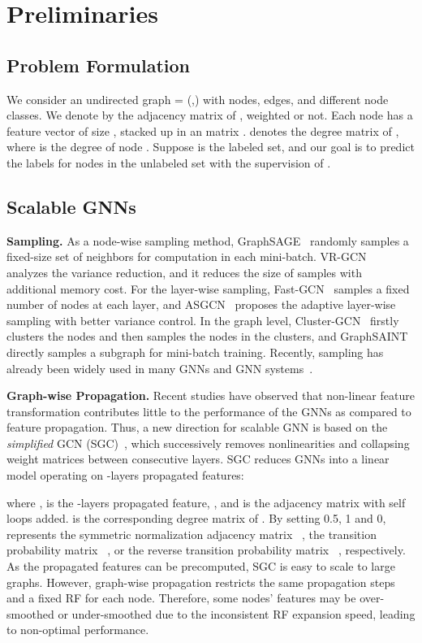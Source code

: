 \documentclass[sigconf]{acmart}
\begin{document}
\section{Preliminaries}
\subsection{Problem Formulation} 
We consider an undirected graph  = (,) with  nodes,  edges, and  different node classes. We denote by  the adjacency matrix of , weighted or not. 
Each node has a feature vector of size , stacked up in an  matrix .  denotes the degree matrix of , where  is the degree of node . 
Suppose  is the labeled set, and our goal is to predict the labels for nodes in the unlabeled set  with the supervision of .

\subsection{Scalable GNNs}
\textbf{Sampling.} 
As a node-wise sampling method, GraphSAGE~\citep{hamilton2017inductive} randomly samples a fixed-size set of neighbors for computation in each mini-batch. VR-GCN~\citep{DBLP:conf/icml/ChenZS18} analyzes the variance reduction, and it reduces the size of samples with additional memory cost.
For the layer-wise sampling, Fast-GCN~\citep{DBLP:conf/iclr/ChenMX18} samples a fixed number of nodes at each layer, and ASGCN~\citep{DBLP:conf/nips/Huang0RH18} proposes the adaptive layer-wise sampling with better variance control.
In the graph level, Cluster-GCN~\citep{chiang2019cluster} firstly clusters the nodes and then samples the nodes in the clusters, and GraphSAINT~\citep{DBLP:conf/iclr/ZengZSKP20} directly samples a subgraph for mini-batch training. 
Recently, sampling has already been widely used in many GNNs and GNN systems~\citep{distdgl_ai3_2020, aligraph_vldb_2019, pygeometric_iclr_2019}.

\noindent\textbf{Graph-wise Propagation.} 
Recent studies have observed that non-linear feature transformation contributes little to the performance of the GNNs as compared to feature propagation.
Thus, a new direction for scalable GNN is based on the \emph{simplified} GCN (SGC)~\citep{wu2019simplifying}, which successively removes nonlinearities and collapsing weight matrices between consecutive layers. 
SGC reduces GNNs into a linear model operating on -layers propagated features: 

\label{eq_GC}
\noindent\ignorespacesafterend
where ,  is the -layers propagated feature, , and  is the adjacency matrix  with self loops added.
 is the corresponding degree matrix of .
By setting  0.5, 1 and 0,  represents the symmetric normalization adjacency matrix  ~\citep{DBLP:conf/iclr/KlicperaBG19}, the transition probability matrix ~\citep{DBLP:conf/iclr/ZengZSKP20}, or the reverse transition probability matrix ~\citep{xu2018representation}, respectively. 
As the propagated features   can be precomputed, SGC is easy to scale to large graphs. However, graph-wise propagation restricts the same propagation steps and a fixed RF for each node. Therefore, some nodes' features may be over-smoothed or under-smoothed due to the inconsistent RF expansion speed, leading to non-optimal performance.
\end{document}
